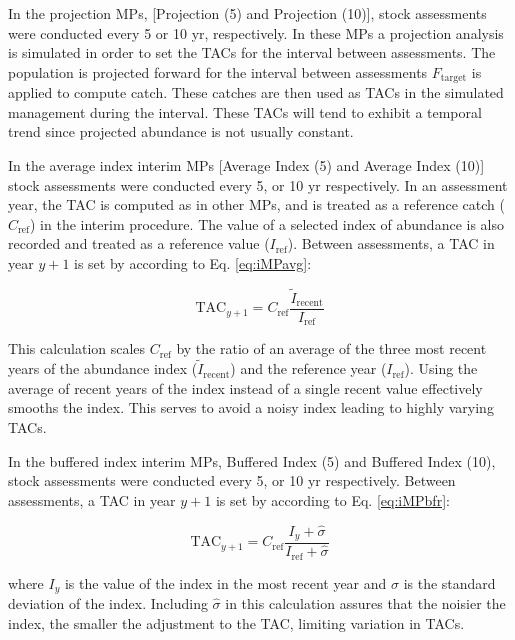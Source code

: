 \documentclass[12pt,english]{article}
\begin{document}
\begin{flushleft}
\begin{spacing}{1.9}
In the projection MPs, [Projection (5) and Projection (10)], stock assessments were conducted every 5 or 10 yr, respectively. In these MPs a projection analysis is simulated in order to set the TACs for the interval between assessments. The population is projected forward for the interval between assessments $F_{\mathrm{target}}$ is applied to compute catch. These catches are then used as TACs in the simulated management during the interval. These TACs will tend to exhibit a temporal trend since projected abundance is not usually constant.

In the average index interim MPs [Average Index (5) and Average Index (10)] stock assessments were conducted every 5, or 10 yr respectively. In an assessment year, the TAC is computed as in other MPs, and is treated as a reference catch ($C_{\mathrm{ref}}$) in the interim procedure. The value of a selected index of abundance is also recorded and treated as a reference value ($I_{\mathrm{ref}}$). Between assessments, a TAC in year $y+1$ is set by  according to Eq. \ref{eq:iMPavg}:

\begin{equation}
\mathrm{TAC}_{y+1} = C_{\mathrm{ref}}\frac{\tilde{I}_{\mathrm{recent}}}{I_{\mathrm{ref}}}
\label{eq:iMPavg}
\end{equation}

This calculation scales $C_{\mathrm{ref}}$ by the ratio of an average of the three most recent years of the abundance index ($\tilde{I}_{\mathrm{recent}}$) and the reference year ($I_{\mathrm{ref}}$). Using the average of recent years of the index instead of a single recent value effectively smooths the index. This serves to avoid a noisy index leading to highly varying TACs.

In the buffered index interim MPs, Buffered Index (5) and Buffered Index (10), stock assessments were conducted every 5, or 10 yr respectively. Between assessments, a TAC in year $y+1$ is set by  according to Eq. \ref{eq:iMPbfr}:

\begin{equation}
\mathrm{TAC}_{y+1} = C_{\mathrm{ref}} \frac{I_{y} + \hat{\sigma}}{I_{\mathrm{ref}} + \hat{\sigma}}
\label{eq:iMPbfr}
\end{equation}

where $I_{y}$ is the value of the index in the most recent year and $\hat{\sigma}$ is the standard deviation of the index. Including $\hat{\sigma}$ in this calculation assures that the noisier the index, the smaller the adjustment to the TAC, limiting variation in TACs.



\end{spacing}
\end{flushleft}
\end{document}
